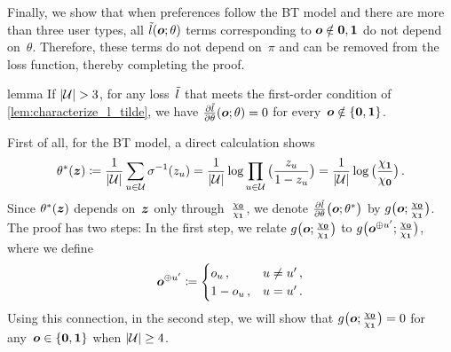 \begin{proofEnd}
    Finally, we show that when preferences follow the BT model and there are more than three user types, all ${\tilde{l}}({\bm{o}}; \theta)$ terms corresponding to ${\bm{o}} \notin {{\bm{0}}, {\bm{1}}}$ do not depend on~$\theta$. Therefore, these terms do not depend on~$\pi$ and can be removed from the loss function, thereby completing the proof. 
    
    \begin{theoremEnd}[restate]{lemma}
    If $|{\mathcal{U}}| > 3$, for any loss~${\tilde{l}}$ that meets the first-order condition of \cref{lem:characterize_l_tilde}, we have $\pd{\till}{\theta}(\vo; \theta) = 0$ for every~${\bm{o}} \notin \{{\bm{0}}, {\bm{1}}\}$. 
    \end{theoremEnd}
    \begin{proofEnd}
        First of all, for the BT model, a direct calculation shows
        \begin{equation*}
            \theta^*({\bm{z}}) \coloneqq \frac{1}{|{\mathcal{U}}|} \sum_{u \in {\mathcal{U}}} \sigma^{-1}(z_u)
            = \frac{1}{|{\mathcal{U}}|} \log \prod_{u \in {\mathcal{U}}} \big(\frac{z_u}{1 - z_u}\big) 
            = \frac{1}{|{\mathcal{U}}|} \log \big(\frac{\chi_{\bm{1}}}{\chi_{\bm{0}}}\big)
            \,.
        \end{equation*}
        Since $\theta^*({\bm{z}})$ depends on~${\bm{z}}$ only through~$\frac{\chi_{\bm{0}}}{\chi_{\bm{1}}}$, we denote $\pd{\till}{\theta}\big(\vo; \theta^*\big)$ by $g\big({\bm{o}}; \frac{\chi_{\bm{0}}}{\chi_{\bm{1}}}\big)$.
        The proof has two steps: In the first step, we relate $g\big({\bm{o}}; \frac{\chi_{\bm{0}}}{\chi_{\bm{1}}}\big)$ to $g\big({\bm{o}}^{\oplus u'}; \frac{\chi_{\bm{0}}}{\chi_{\bm{1}}}\big)$, where we define
        \begin{equation*}
            {\bm{o}}^{\oplus u'} \coloneqq \begin{cases}
                o_u \,, & u \neq u' \,, \\
                1 - o_u \,, & u = u' \,.
            \end{cases}
        \end{equation*}
        Using this connection, in the second step, we will show that $g\big({\bm{o}}; \frac{\chi_{\bm{0}}}{\chi_{\bm{1}}}\big) = 0$ for any~${\bm{o}} \in \{{\bm{0}}, {\bm{1}}\}$ when $|{\mathcal{U}}| \ge 4$.
        

\end{proofEnd}
\end{proofEnd}
